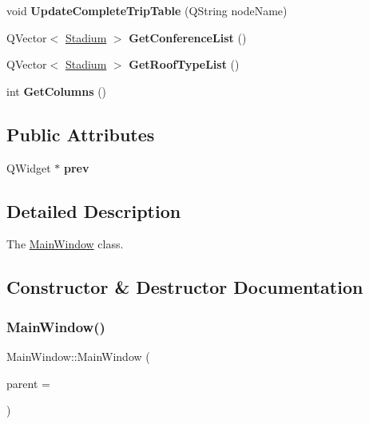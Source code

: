 \begin{DoxyCompactItemize}
\item 
\mbox{\label{class_main_window_a0ec1e8ea402d14f4324599507162976e}} 
void {\bfseries Update\+Complete\+Trip\+Table} (Q\+String node\+Name)
\item 
\mbox{\label{class_main_window_acbbb539ca5d395a4aeb5ca5a6e8a42f1}} 
Q\+Vector$<$ \mbox{\hyperlink{struct_stadium}{Stadium}} $>$ {\bfseries Get\+Conference\+List} ()
\item 
\mbox{\label{class_main_window_aa2f387d72f93e084c2ae9022bfe7ab8a}} 
Q\+Vector$<$ \mbox{\hyperlink{struct_stadium}{Stadium}} $>$ {\bfseries Get\+Roof\+Type\+List} ()
\item 
\mbox{\label{class_main_window_a5bdb634641165366ed13cca90183dae5}} 
int {\bfseries Get\+Columns} ()
\end{DoxyCompactItemize}
\subsection*{Public Attributes}
\begin{DoxyCompactItemize}
\item 
\mbox{\label{class_main_window_a7cd04758f576a9f4d93e32e27f01443b}} 
Q\+Widget $\ast$ {\bfseries prev}
\end{DoxyCompactItemize}


\subsection{Detailed Description}
The \mbox{\hyperlink{class_main_window}{Main\+Window}} class. 

\subsection{Constructor \& Destructor Documentation}
\mbox{\label{class_main_window_a8b244be8b7b7db1b08de2a2acb9409db}} 
\subsubsection{\texorpdfstring{Main\+Window()}{MainWindow()}}
{\footnotesize\ttfamily Main\+Window\+::\+Main\+Window (\begin{DoxyParamCaption}\item[{Q\+Widget $\ast$}]{parent = {} }\end{DoxyParamCaption})\hspace{0.3cm}{\ttfamily [explicit]}}



